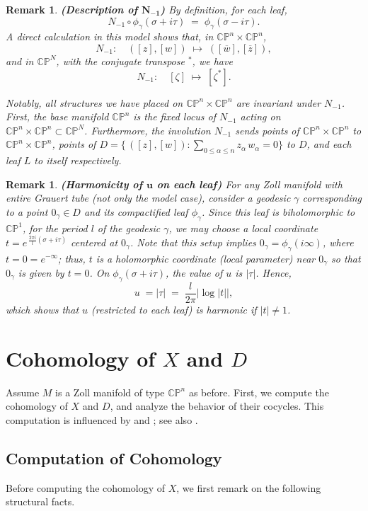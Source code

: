 \documentclass[a4paper, 12pt]{article}
\newcommand{\oX}{X}
\newcommand{\bCP}{\mathbb{CP}^n}
\newcommand{\tCP}{\mathbb{CP}^n\times\mathbb{CP}^n}
\newtheorem{rem}[thm]{Remark}
\begin{document}
\begin{rem}\label{N}\textbf{(Description of $\boldsymbol{N_{-1}}$)}
By definition, for each leaf,
\[
N_{-1}\circ\phi_\gamma(\sigma+i\tau)
\;=\;
\phi_\gamma(\sigma - i\tau).
\]
A direct calculation in this model shows that, in \(\tCP\), 
\[
N_{-1}:\quad
([z],[w]) \;\longmapsto\;([\overline{w}],[\overline{z}]),
\]
and in \(\mathbb{CP}^N\), with the conjugate transpose \(^*\), we have
\[
N_{-1}:\quad
[\zeta]\;\longmapsto\;[\zeta^*].
\]

Notably, all structures we have placed on \(\tCP\) are invariant under \(N_{-1}\). First, the base manifold \(\bCP\) is the fixed locus of \(N_{-1}\) acting on \(\tCP\subset\mathbb{CP}^N\). Furthermore, the involution \(N_{-1}\) sends points of \(\tCP\) to \(\tCP\), points of \(D=\bigl\{\,([z],[w]) : \sum_{0\le \alpha \le n} z_\alpha\,w_\alpha=0\bigr\}\) to \(D\), and each leaf \(L\) to itself respectively.
\end{rem}


\begin{rem}\label{limit}\textbf{(Harmonicity of $\boldsymbol{u}$ on each leaf)}
For any Zoll manifold with entire Grauert tube (not only the model case), consider a geodesic \(\gamma\) corresponding to a point \(0_\gamma\in D\) and its compactified leaf \(\phi_\gamma\). Since this leaf is biholomorphic to \(\mathbb{CP}^1\), for the period $l$ of the geodesic $\gamma$, we may choose a local coordinate \(t = e^{\, \frac{2\pi i}{l}(\sigma + i\tau)}\) centered at \(0_\gamma\). Note that this setup implies \(0_\gamma= \phi_\gamma(i\infty)\), where \(t = 0 = e^{-\infty}\); thus, \(t\) is a holomorphic coordinate (local parameter) near $0_\gamma$ so that $0_\gamma$ is given by $t=0$. On \(\phi_\gamma(\sigma+i\tau)\), the value of \(u\) is \(\lvert\tau\rvert\). Hence,
\[
u \;=\lvert\tau\rvert
\;=\;
\frac{l}{2\pi}\bigl|\log\lvert t\rvert\bigr|,
\]
which shows that \(u\) (restricted to each leaf) is harmonic if $|t|\neq 1$.
\end{rem}

\section{Cohomology of $\oX$ and $D$}

Assume $M$ is a Zoll manifold of type $\bCP$ as before.
First, we compute the cohomology of $\oX$ and $D$, and analyze the behavior of their cocycles. This computation is influenced by \cite{R90} and \cite{Y91}; see also \cite{A07}.

\subsection{Computation of Cohomology}
Before computing the cohomology of $X$, we first remark on the following structural facts.
\end{document}
